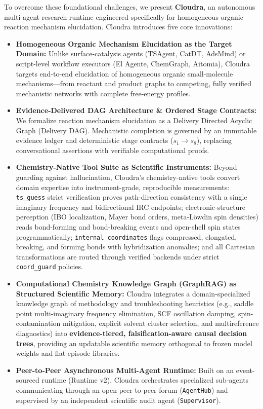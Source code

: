 \documentclass[10pt,twocolumn,letterpaper]{article}
\begin{document}
To overcome these foundational challenges, we present \textbf{Cloudra}, an autonomous multi-agent research runtime engineered specifically for homogeneous organic reaction mechanism elucidation. Cloudra introduces five core innovations:
\begin{itemize}[leftmargin=*]
\item \textbf{Homogeneous Organic Mechanism Elucidation as the Target Domain:} Unlike surface-catalysis agents (TSAgent, CatDT, AdsMind) or script-level workflow executors (El Agente, ChemGraph, Aitomia), Cloudra targets end-to-end elucidation of homogeneous organic small-molecule mechanisms---from reactant and product graphs to competing, fully verified mechanistic networks with complete free-energy profiles.
\item \textbf{Evidence-Delivered DAG Architecture \& Ordered Stage Contracts:} We formalize reaction mechanism elucidation as a Delivery Directed Acyclic Graph (Delivery DAG). Mechanistic completion is governed by an immutable evidence ledger and deterministic stage contracts ($s_1 \rightarrow s_8$), replacing conversational assertions with verifiable computational proofs.
\item \textbf{Chemistry-Native Tool Suite as Scientific Instruments:} Beyond guarding against hallucination, Cloudra's chemistry-native tools convert domain expertise into instrument-grade, reproducible measurements: \texttt{ts\_guess} strict verification proves path-direction consistency with a single imaginary frequency and bidirectional IRC endpoints; electronic-structure perception (IBO localization, Mayer bond orders, meta-L\"owdin spin densities) reads bond-forming and bond-breaking events and open-shell spin states programmatically; \texttt{internal\_coordinates} flags compressed, elongated, breaking, and forming bonds with hybridization anomalies; and all Cartesian transformations are routed through verified backends under strict \texttt{coord\_guard} policies.
\item \textbf{Computational Chemistry Knowledge Graph (GraphRAG) as Structured Scientific Memory:} Cloudra integrates a domain-specialized knowledge graph of methodology and troubleshooting heuristics (e.g., saddle point multi-imaginary frequency elimination, SCF oscillation damping, spin-contamination mitigation, explicit solvent cluster selection, and multireference diagnostics) into \textbf{evidence-tiered, falsification-aware causal decision trees}, providing an updatable scientific memory orthogonal to frozen model weights and flat episode libraries.
\item \textbf{Peer-to-Peer Asynchronous Multi-Agent Runtime:} Built on an event-sourced runtime (Runtime v2), Cloudra orchestrates specialized sub-agents communicating through an open peer-to-peer forum (\texttt{AgentHub}) and supervised by an independent scientific audit agent (\texttt{Supervisor}).
\end{itemize}
\end{document}
